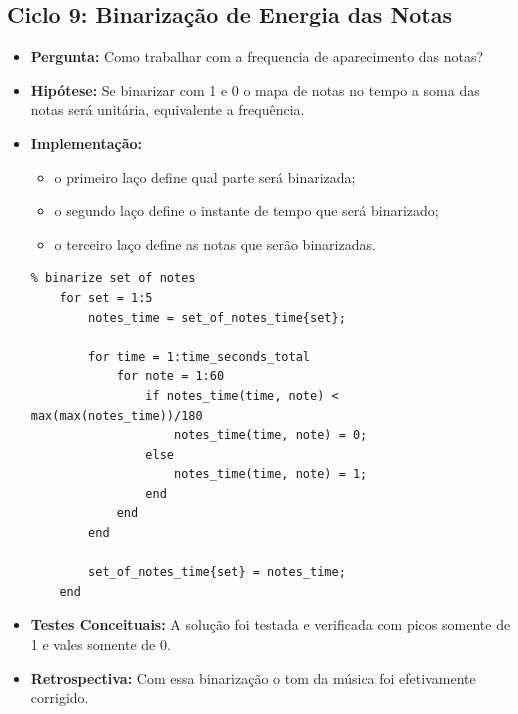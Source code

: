 \subsection{Ciclo 9: Binarização de Energia das Notas}
\label{subsec:ciclo_9}
\begin{itemize}
\item \textbf{Pergunta:} Como trabalhar com a frequencia de aparecimento das notas?
\item \textbf{Hipótese:} Se binarizar com 1 e 0 o mapa de notas no tempo a soma das notas será unitária, equivalente a frequência.
\item \textbf{Implementação:}
\begin{itemize} 
	\item o primeiro laço define qual parte será binarizada;
	\item o segundo laço define o instante de tempo que será binarizado;
	\item o terceiro laço define as notas que serão binarizadas.
\end{itemize}
\begin{lstlisting}
% binarize set of notes
    for set = 1:5
        notes_time = set_of_notes_time{set};
        
        for time = 1:time_seconds_total
            for note = 1:60
                if notes_time(time, note) < max(max(notes_time))/180
                    notes_time(time, note) = 0;
                else
                    notes_time(time, note) = 1;
                end
            end
        end

        set_of_notes_time{set} = notes_time;
    end
\end{lstlisting}
\item \textbf{Testes Conceituais:} A solução foi testada e verificada com picos somente de 1 e vales somente de 0. 
\item \textbf{Retrospectiva:} Com essa binarização o tom da música foi efetivamente corrigido.
\end{itemize}

